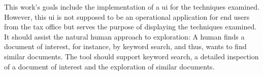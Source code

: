 This work's goals include the implementation of a \ac{ui} for the techniques examined.
However, this \ac{ui} is not supposed to be an operational application for end users from the tax office 
but serves the purpose of displaying the techniques examined.
It should assist the natural human approach to exploration:
A human finds a document of interest, for instance, by keyword search, and thus, wants to find similar documents.
The tool should support keyword search, a detailed inspection of a document of interest and the exploration of similar documents.